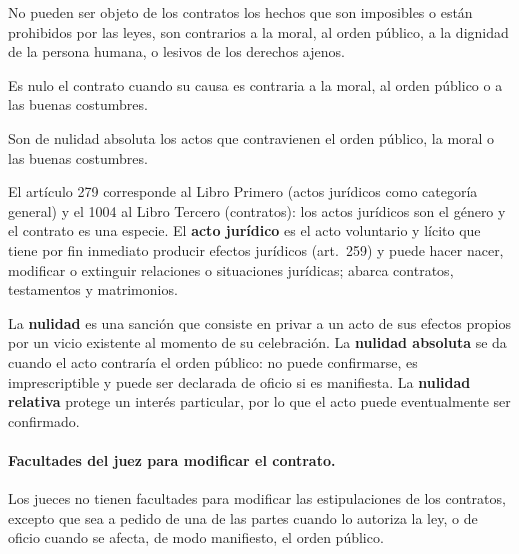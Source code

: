 \documentclass[12pt,oneside]{book}
\begin{document}
\begin{regla}
No pueden ser objeto de los contratos los hechos que son imposibles o están prohibidos por las leyes, son contrarios a la moral, al orden público, a la dignidad de la persona humana, o lesivos de los derechos ajenos.
\end{regla}

\begin{regla}
Es nulo el contrato cuando su causa es contraria a la moral, al orden público o a las buenas costumbres.
\end{regla}

\begin{regla}
Son de nulidad absoluta los actos que contravienen el orden público, la moral o las buenas costumbres.
\end{regla}

El artículo 279 corresponde al Libro Primero (actos jurídicos como categoría general) y el 1004 al Libro Tercero (contratos): los actos jurídicos son el género y el contrato es una especie. El \textbf{acto jurídico} es el acto voluntario y lícito que tiene por fin inmediato producir efectos jurídicos (art.~259) y puede hacer nacer, modificar o extinguir relaciones o situaciones jurídicas; abarca contratos, testamentos y matrimonios.

\begin{definicion}
La \textbf{nulidad} es una sanción que consiste en privar a un acto de sus efectos propios por un vicio existente al momento de su celebración. La \textbf{nulidad absoluta} se da cuando el acto contraría el orden público: no puede confirmarse, es imprescriptible y puede ser declarada de oficio si es manifiesta. La \textbf{nulidad relativa} protege un interés particular, por lo que el acto puede eventualmente ser confirmado.
\end{definicion}

\paragraph{Facultades del juez para modificar el contrato.}

\begin{regla}
Los jueces no tienen facultades para modificar las estipulaciones de los contratos, excepto que sea a pedido de una de las partes cuando lo autoriza la ley, o de oficio cuando se afecta, de modo manifiesto, el orden público.
\end{regla}
\end{document}
